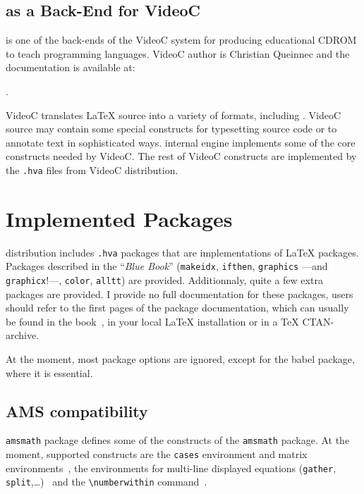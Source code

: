\subsection{\hevea{} as a Back-End for VideoC}
\hevea{} is one of the back-ends of the VideoC system for producing
educational CDROM to teach programming languages.
VideoC author is Christian Queinnec and the documentation is available
at:
\begin{center}
.
\end{center}


VideoC translates \LaTeX{} source into a variety of formats, including
\html. VideoC source may contain some special constructs for
typesetting source code or to annotate text in sophisticated ways.
\hevea{} internal engine implements some of the core constructs needed
by VideoC. The rest of VideoC constructs are implemented by
the \texttt{.hva} files from VideoC distribution.


\section{Implemented Packages}\label{implemented:package}
%
\hevea{} distribution includes \texttt{.hva} packages that are
implementations of \LaTeX{} packages.
Packages described in the ``\emph{Blue Book}'' (\texttt{makeidx},
\texttt{ifthen}, \texttt{graphics} ---and \texttt{graphicx}!---,
\texttt{color}, \texttt{alltt}) are provided.  Additionnaly, quite a
few extra packages are provided.  I provide no full documentation for
these packages, users should refer to the first pages of the package
documentation, which can usually be found in the book~\cite{latexbis},
in your local
\LaTeX{} installation or in a TeX CTAN-archive.

At the moment, most package options are ignored, except for the babel
package, where it is essential.

\subsection{AMS compatibility}
%
\hevea{} \texttt{amsmath} package defines  some of the constructs of the
\texttt{amsmath} package.  At the moment, supported constructs are
the \verb+cases+ environment and matrix
environments~\cite[Section~8.4]{latexbis}, the
environments for multi-line displayed
equations (\verb+gather+,
\verb+split+,\ldots)~\cite[Section~8.5]{latexbis} and the
\verb+\numberwithin+ command~\cite[Section~8.6.2]{latexbis}.

